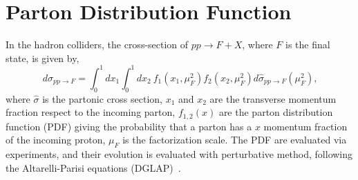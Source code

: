\documentclass[PhD,binding=0.6cm]{../sapthesis}
\begin{document}
\chapter{Parton Distribution Function}
\label{pdfa}
In  the hadron colliders, the cross-section of $pp \to F+X $, where $F$ is the final state, is given by,
\begin{equation}
d \sigma_{pp \rightarrow F} = \int_0 ^1 dx_1 \int_0 ^1 d x_2 \: f_1(x_1, \mu_F^2) f_2(x_2, \mu_F^2) d \hat{\sigma}_{pp \rightarrow F}(\mu_F ^2)  \mbox{,}\end{equation}
where  $\hat{\sigma}$ is the partonic cross section, $x_1$ and  $x_2$ are the transverse momentum fraction respect to the incoming parton,  $f_{1,2}(x)$ are the 
parton distribution function (PDF) giving the probability that a parton has a $x$ momentum fraction of the incoming proton,  $\mu_F$ is the factorization scale.
The PDF are evaluated via experiments, and their evolution is evaluated with perturbative method, following the Altarelli-Parisi equations (DGLAP)~\cite{Altarelli:1977zs}.


\end{document}
